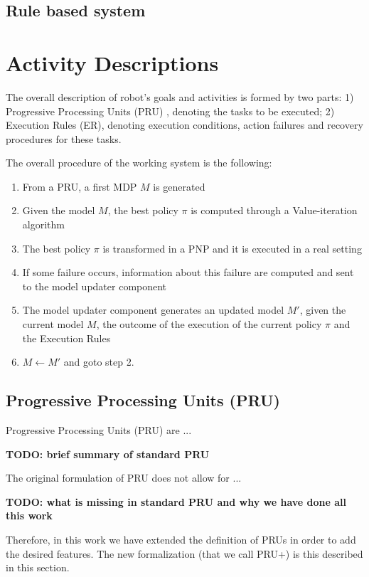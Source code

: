 \subsection{Rule based system}

\section{Activity Descriptions}

The overall description of robot's goals and activities is formed by two parts:
1) Progressive Processing Units (PRU) \cite{CaMoZi01}, denoting the tasks to be executed;
2) Execution Rules (ER), denoting execution conditions, action failures and recovery procedures for these tasks.

The overall procedure of the working system is the following:
\begin{enumerate}
\item From a PRU, a first MDP $M$ is generated 
\item Given the model $M$, the best policy $\pi$ is computed through a Value-iteration algorithm
\item The best policy $\pi$ is transformed in a PNP and it is executed in a real setting
\item If some failure occurs, information about this failure are computed and sent to the model updater component
\item The model updater component generates an updated model $M'$, given the current model $M$, the outcome of the execution of the current policy $\pi$ and the Execution Rules
\item $M \leftarrow M'$ and goto step 2. 
\end{enumerate}



\subsection{Progressive Processing Units (PRU)}

Progressive Processing Units (PRU) are ... \cite{}

{\bf TODO: brief summary of standard PRU}

The original formulation of PRU does not allow for ...

{\bf TODO: what is missing in standard PRU and why we have done all this work}



Therefore, in this work we have extended the definition of PRUs in order to add the desired features. The new formalization (that we call PRU+) is this described in this section.

